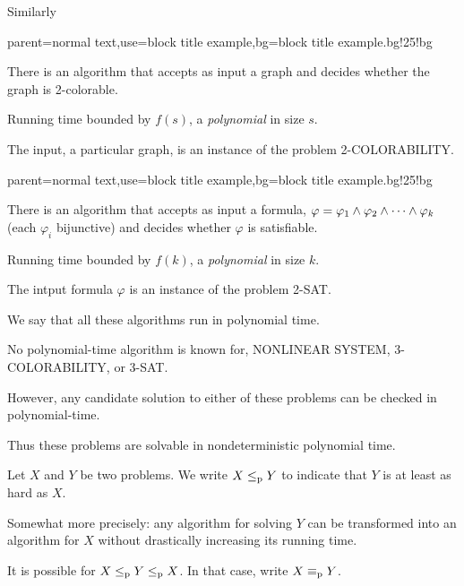 \documentclass[12pt,xcolor=dvipsnames%
   ]{beamer}
\newcommand{\bigpause}{\pause\bigskip}
\renewcommand{\.}{\cdot}
\newcommand{\reduc}{\leq_{\text{\textnormal{p}}}}
\newcommand{\equivp}{\equiv_{\text{\textnormal{p}}}}
\renewcommand{\phi}{\ensuremath{\varphi}}
\begin{document}
\begin{frame}
  Similarly

  {parent=normal text,use=block title example,bg=block title example.bg!25!bg}
  \begin{exampleblock}{}
    There is an algorithm that accepts as input a graph and decides
    whether the graph is 2-colorable.

    \smallskip
    Running time bounded by $f(s)$, a \emph{polynomial} in 
    size $s$.
  \end{exampleblock}

  The \alert{input}, a particular graph, is an \alert{instance} of the \alert{problem} 
  2-COLORABILITY.
\end{frame}


\begin{frame}
  {parent=normal text,use=block title example,bg=block title example.bg!25!bg}
  \begin{exampleblock}{}
  There is an algorithm that accepts as input a formula, $\phi = \phi_1 \meet \phi_2 \meet \cdots \meet \phi_k$ (each $\phi_i$ bijunctive) and decides whether $\phi$ is satisfiable.
  
  \smallskip
  Running time bounded by $f(k)$, a \emph{polynomial} in size $k$.
  \end{exampleblock}
  
  The \alert{intput} formula $\phi$ is an \alert{instance} of the \alert{problem} 2-SAT.

  We say that all these algorithms run in \alert{polynomial time}.
\end{frame}

\begin{frame}
  No polynomial-time algorithm is known for, NONLINEAR SYSTEM,
  3-COLORABILITY, or 3-SAT.

  \bigpause
  However, any candidate solution to either of these problems can be
  checked in polynomial-time. 

  \bigpause
  Thus these problems are solvable in \alert{nondeterministic polynomial
    time.} 
\end{frame}

\begin{frame}
  Let $X$ and $Y$ be two problems. We write $X \reduc Y$ to indicate that
  $Y$ is at least as hard as $X$.

  \bigpause
  Somewhat more precisely: any algorithm for solving $Y$ can be
  transformed into an algorithm for $X$ without drastically increasing
  its running time.

  \bigpause
  It is possible for $X\reduc Y \reduc X$. In that case, write $X\equivp
  Y$. 

\end{frame}
\end{document}
